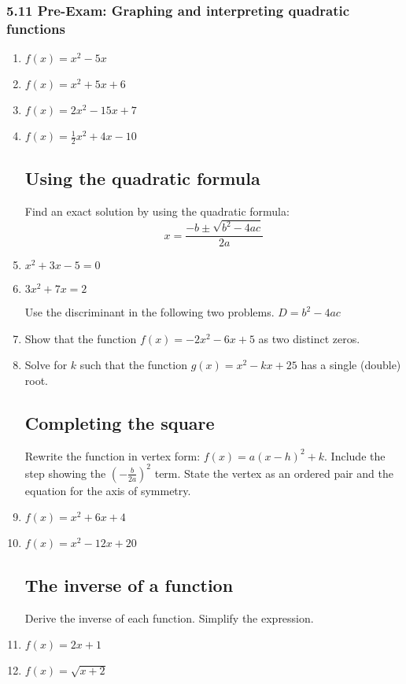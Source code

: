 \documentclass[12pt, twoside]{article}
\begin{document}
\subsubsection*{5.11 Pre-Exam: Graphing and interpreting quadratic functions}

\begin{enumerate}
    \item   $f(x)=x^2-5x$
    \item   $f(x)=x^2+5x+6$
    \item   $f(x)=2x^2-15x+7$
    \item   $f(x)=\frac{1}{2}x^2+4x-10$
    
    \subsection*{Using the quadratic formula}
    
    Find an exact solution by using the quadratic formula: 
    \[x=\frac{-b \pm \sqrt{b^2-4ac}}{2a}\]
    \item   $x^2+3x-5=0$
    \item   $3x^2+7x = 2$
    
    Use the discriminant in the following two problems. $D=b^2-4ac$ 
    \item Show that the function $f(x)=-2x^2-6x+5$ as two distinct zeros.
    \item Solve for $k$ such that the function $g(x)=x^2-kx+25$ has a single (double) root.
    
    \subsection*{Completing the square}
    
    Rewrite the function in vertex form: $f(x)=a(x-h)^2+k$. Include the step showing the $(-\frac{b}{2a})^2$ term. State the vertex as an ordered pair and the equation for the axis of symmetry.
    \item   $f(x)=x^2+6x+4$
    \item   $f(x)=x^2-12x+20$
    
    \subsection*{The inverse of a function}
    Derive the inverse of each function. Simplify the expression.
    \item   $f(x)=2x+1$
    \item   $f(x)=\sqrt{x+2}$
    

\end{enumerate}
\end{document}
